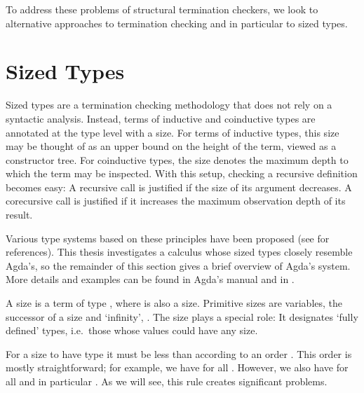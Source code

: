 To address these problems of structural termination checkers, we look to
alternative approaches to termination checking and in particular to sized types.


\section{Sized Types}
\label{sec:background:sized}

Sized types are a termination checking methodology that does not rely on a
syntactic analysis. Instead, terms of inductive and coinductive types are
annotated at the type level with a size. For terms of inductive types, this size
may be thought of as an upper bound on the height of the term, viewed as a
constructor tree. For coinductive types, the size denotes the maximum depth to
which the term may be inspected. With this setup, checking a recursive
definition becomes easy: A recursive call is justified if the size of its
argument decreases. A corecursive call is justified if it increases the maximum
observation depth of its result.

Various type systems based on these principles have been proposed (see
 for references). This thesis investigates a calculus
whose sized types closely resemble Agda's, so the remainder of this section
gives a brief overview of Agda's system. More details and examples can be found
in Agda's manual \cite{agdamanual} and in \cite{abel2016}.

A size is a term of type , where  is also a size.
Primitive sizes are variables, the successor of a size  and
\enquote*{infinity}, . The size  plays a special role: It
designates \enquote*{fully defined} types, i.e.\ those whose values could have any
size.

For a size  to have type  it must be less than
 according to an order \icode{<}. This order is mostly straightforward;
for example, we have  for all . However, we also have
 for all  and in particular . As we will see,
this rule creates significant problems.


